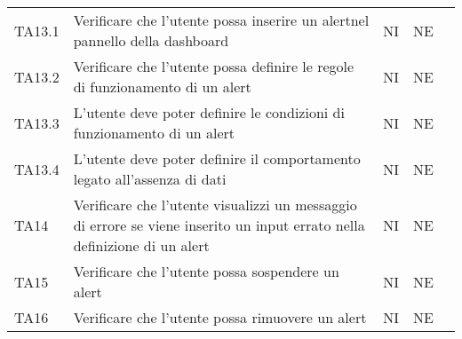 \begin{longtable} {
		>{}p{15mm} 
		>{}p{79.5mm}
		>{}p{15mm} 
		>{}p{15mm}
		>{}p{0mm}}
	TA13.1	& Verificare che l'utente possa inserire un alert\glosp nel pannello della dashboard\glo & NI & NE  &\TBstrut \\ [2mm]
	TA13.2	& Verificare che l'utente possa definire le regole di funzionamento di un alert\glo & NI & NE  &\TBstrut \\ [2mm]
	TA13.3	& L'utente deve poter definire le condizioni di funzionamento di un alert\glo & NI & NE  &\TBstrut \\ [2mm]
	TA13.4	& L'utente deve poter definire il comportamento legato all'assenza di dati  & NI & NE  &\TBstrut \\ [2mm]
	TA14	& Verificare che l'utente visualizzi un messaggio di errore se viene inserito un input errato nella definizione di un alert\glo & NI & NE  &\TBstrut \\ [2mm]
	TA15	& Verificare che l'utente possa sospendere un alert\glo & NI & NE  &\TBstrut \\ [2mm]
	TA16	& Verificare che l'utente possa rimuovere un alert\glo & NI & NE  &\TBstrut \\ [2mm]


\end{longtable}
